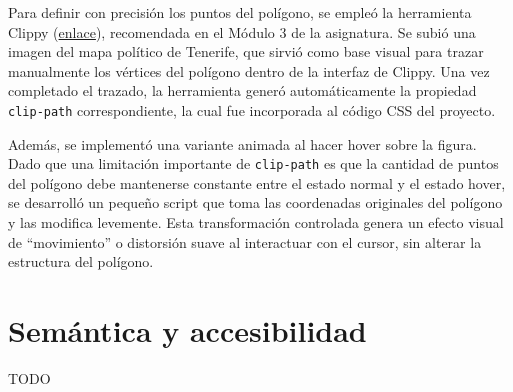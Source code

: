 \documentclass{article}
\begin{document}
Para definir con precisión los puntos del polígono, se empleó la herramienta Clippy (\href{https://bennettfeely.com/clippy/}{enlace}), recomendada en el Módulo 3 de la asignatura. Se subió una imagen del mapa político de Tenerife, que sirvió como base visual para trazar manualmente los vértices del polígono dentro de la interfaz de Clippy. Una vez completado el trazado, la herramienta generó automáticamente la propiedad \texttt{clip-path} correspondiente, la cual fue incorporada al código CSS del proyecto.

Además, se implementó una variante animada al hacer hover sobre la figura. Dado que una limitación importante de \texttt{clip-path} es que la cantidad de puntos del polígono debe mantenerse constante entre el estado normal y el estado hover, se desarrolló un pequeño script que toma las coordenadas originales del polígono y las modifica levemente. Esta transformación controlada genera un efecto visual de ``movimiento'' o distorsión suave al interactuar con el cursor, sin alterar la estructura del polígono.

\section{Semántica y accesibilidad}\label{sec:semantica-y-accesibilidad}

TODO
\end{document}
